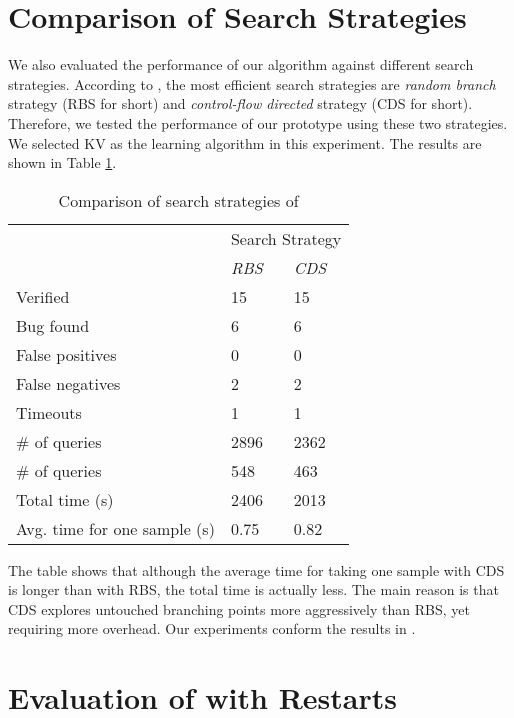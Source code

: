 \section{Comparison of Search Strategies}\label{sec:compare_crest_strategies}

We also evaluated the performance of our algorithm against different \CREST search strategies. According to \cite{BurnimS08}, the most efficient search strategies are \emph{random branch} strategy (RBS for short) and \emph{control-flow directed} strategy (CDS for short). Therefore, we tested the performance of our prototype using these two strategies. We selected KV as the learning algorithm in this experiment. The results are shown in Table \ref{table:compare_crest_strategies}. 

\begin{table}[h]
	\caption{Comparison of search strategies of \CREST}
	\label{table:compare_crest_strategies}
	\centering
	\begin{tabular}{|l|l|l|}
		\cline{2-3}
		\multicolumn{1}{c|}{} & \multicolumn{2}{c|}{Search Strategy} \\
		\cline{2-3}
		\multicolumn{1}{c|}{} & \emph{RBS} & \emph{CDS} \\
		\hline
		Verified & 15 & 15 \\
		Bug found & 6 & 6 \\
		\hline
		False positives & 0 & 0 \\
		False negatives & 2 & 2 \\
		Timeouts & 1 & 1 \\
		\hline
		\# of \Mem queries & 2896 & 2362 \\
		\# of \Equ queries & 548 & 463 \\
		\hline
		Total time (s) & 2406 & 2013 \\ 
		Avg. time for one sample (s) & 0.75 & 0.82 \\
		\hline
	\end{tabular}
\end{table}

The table shows that although the average time for taking one sample with CDS is longer than with RBS, the total time is actually less. The main reason is that CDS explores untouched branching points more aggressively than RBS, yet requiring more overhead. Our experiments conform the results in \cite{BurnimS08}.

\section{Evaluation of \CREST with Restarts}\label{sec:eval_crest_restarts}

